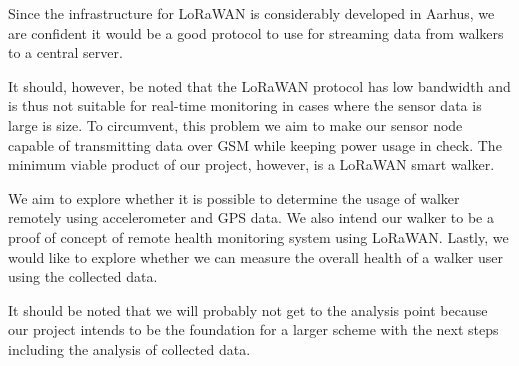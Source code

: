 Since the infrastructure for LoRaWAN is considerably developed in Aarhus, we are confident it would be a good protocol to use for streaming data from walkers to a central server.

It should, however, be noted that the LoRaWAN protocol has low bandwidth and is thus not suitable for real-time monitoring in cases where the sensor data is large is size. To circumvent, this problem we aim to make our sensor node capable of transmitting data over GSM while keeping power usage in check. The minimum viable product of our project, however, is a LoRaWAN smart walker.

We aim to explore whether it is possible to determine the usage of walker remotely using accelerometer and GPS data. We also intend our walker to be a proof of concept of remote health monitoring system using LoRaWAN. Lastly, we would like to explore whether we can measure the overall health of a walker user using the collected data.

It should be noted that we will probably not get to the analysis point because our project intends to be the foundation for a larger scheme with the next steps including the analysis of collected data.

